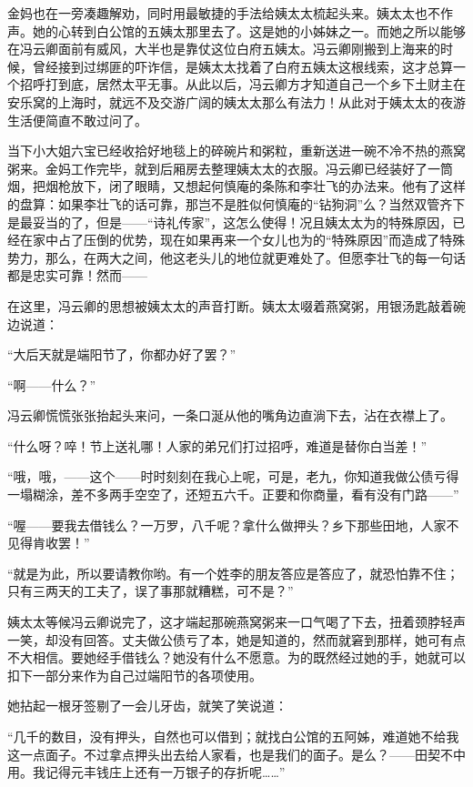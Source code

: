 \par 金妈也在一旁凑趣解劝，同时用最敏捷的手法给姨太太梳起头来。姨太太也不作声。她的心转到白公馆的五姨太那里去了。这是她的小姊妹之一。而她之所以能够在冯云卿面前有威风，大半也是靠仗这位白府五姨太。冯云卿刚搬到上海来的时候，曾经接到过绑匪的吓诈信，是姨太太找着了白府五姨太这根线索，这才总算一个招呼打到底，居然太平无事。从此以后，冯云卿方才知道自己一个乡下土财主在安乐窝的上海时，就远不及交游广阔的姨太太那么有法力！从此对于姨太太的夜游生活便简直不敢过问了。
\par 当下小大姐六宝已经收拾好地毯上的碎碗片和粥粒，重新送进一碗不冷不热的燕窝粥来。金妈工作完毕，就到后厢房去整理姨太太的衣服。冯云卿已经装好了一筒烟，把烟枪放下，闭了眼睛，又想起何慎庵的条陈和李壮飞的办法来。他有了这样的盘算：如果李壮飞的话可靠，那岂不是胜似何慎庵的“钻狗洞”么？当然双管齐下是最妥当的了，但是——“诗礼传家”，这怎么使得！况且姨太太为的特殊原因，已经在家中占了压倒的优势，现在如果再来一个女儿也为的“特殊原因”而造成了特殊势力，那么，在两大之间，他这老头儿的地位就更难处了。但愿李壮飞的每一句话都是忠实可靠！然而——
\par 在这里，冯云卿的思想被姨太太的声音打断。姨太太啜着燕窝粥，用银汤匙敲着碗边说道：
\par “大后天就是端阳节了，你都办好了罢？”
\par “啊——什么？”
\par 冯云卿慌慌张张抬起头来问，一条口涎从他的嘴角边直淌下去，沾在衣襟上了。
\par “什么呀？啐！节上送礼哪！人家的弟兄们打过招呼，难道是替你白当差！”
\par “哦，哦，——这个——时时刻刻在我心上呢，可是，老九，你知道我做公债亏得一塌糊涂，差不多两手空空了，还短五六千。正要和你商量，看有没有门路——”
\par “喔——要我去借钱么？一万罗，八千呢？拿什么做押头？乡下那些田地，人家不见得肯收罢！”
\par “就是为此，所以要请教你哟。有一个姓李的朋友答应是答应了，就恐怕靠不住；只有三两天的工夫了，误了事那就糟糕，可不是？”
\par 姨太太等候冯云卿说完了，这才端起那碗燕窝粥来一口气喝了下去，扭着颈脖轻声一笑，却没有回答。丈夫做公债亏了本，她是知道的，然而就窘到那样，她可有点不大相信。要她经手借钱么？她没有什么不愿意。为的既然经过她的手，她就可以扣下一部分来作为自己过端阳节的各项使用。
\par 她拈起一根牙签剔了一会儿牙齿，就笑了笑说道：
\par “几千的数目，没有押头，自然也可以借到；就找白公馆的五阿姊，难道她不给我这一点面子。不过拿点押头出去给人家看，也是我们的面子。是么？——田契不中用。我记得元丰钱庄上还有一万银子的存折呢……”
